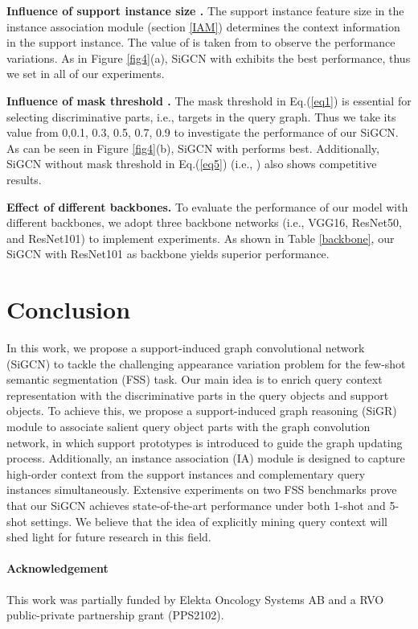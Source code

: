 \documentclass{bmvc2k}
\begin{document}
\textbf{Influence of support instance size .}
The support instance feature size  in the instance association module (section \ref{IAM}) determines the context information in the support instance. The value of  is taken from  to observe the performance variations. As in Figure \ref{fig4}(a), SiGCN with  exhibits the best performance, thus we set  in all of our experiments.

\textbf{Influence of mask threshold .}
The mask threshold  in Eq.(\ref{eq1}) is essential for selecting discriminative parts, i.e., targets in the query graph. Thus we take its value from {0,0.1, 0.3, 0.5, 0.7, 0.9} to investigate the performance of our SiGCN. As can be seen in Figure \ref{fig4}(b), SiGCN with  performs best. Additionally, SiGCN without mask threshold in Eq.(\ref{eq5}) (i.e., ) also shows competitive results.

\textbf{Effect of different backbones.}
To evaluate the performance of our model with different backbones, we adopt three backbone networks (i.e., VGG16, ResNet50, and ResNet101) to implement experiments. As shown in Table \ref{backbone}, our SiGCN with ResNet101 as backbone yields superior performance. \section{Conclusion}
In this work, we propose a support-induced graph convolutional network (SiGCN) to tackle the challenging appearance variation problem for the few-shot semantic segmentation (FSS) task. Our main idea is to enrich query context representation with the discriminative parts in the query objects and support objects. To achieve this, we propose a support-induced graph reasoning (SiGR) module to associate salient query object parts with the graph convolution network, in which support prototypes is introduced to guide the graph updating process. Additionally, an instance association (IA) module is designed to capture high-order context from the support instances and complementary query instances simultaneously. Extensive experiments on two FSS benchmarks prove that our SiGCN achieves state-of-the-art performance under both 1-shot and 5-shot settings. We believe that the idea of explicitly mining query context will shed light for future research in this field.

\paragraph{Acknowledgement} This work was partially funded by Elekta Oncology Systems AB and a RVO public-private partnership grant (PPS2102). 

\end{document}
